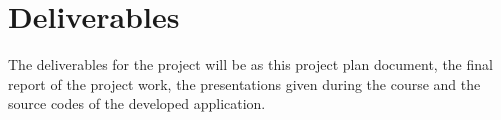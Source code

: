 \section{Deliverables}

The deliverables for the project will be as this project plan document, the final report of the project work, the presentations given during the course and the source codes of the developed application. 